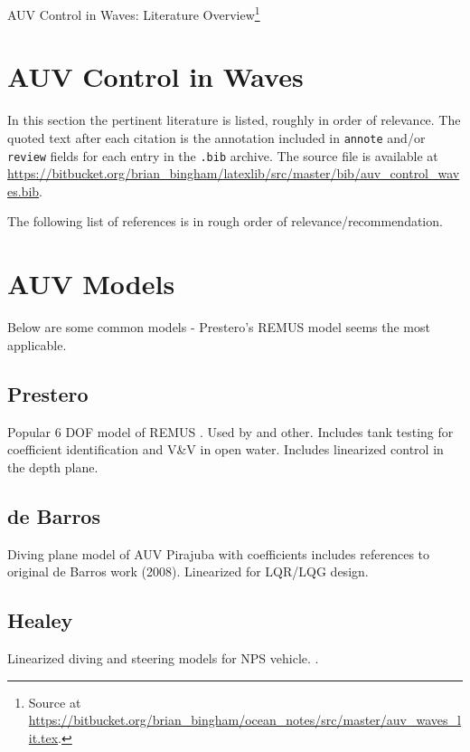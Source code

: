 \documentclass[11pt]{article}
\newcommand{\doctitle}{AUV Control in Waves: Literature Overview}
\begin{document}
\newpage
\setcounter{page}{1}
\begin{center}
{\huge \doctitle}\footnote{Source at \url{https://bitbucket.org/brian_bingham/ocean_notes/src/master/auv_waves_lit.tex}.}
\end{center}


\section{AUV Control in Waves}

\def  \Bibfname {auv_control_waves}

In this section the pertinent literature is listed, roughly in order of relevance.  The quoted text after each citation is the annotation included in \texttt{annote} and/or \texttt{review} fields for each entry in the \texttt{.bib} archive.  The source file is available at \url{https://bitbucket.org/brian_bingham/latexlib/src/master/bib/auv_control_waves.bib}.

The following list of references is in rough order of relevance/recommendation.



\bibliographyc{\Bibfname}


\section{AUV Models}

Below are some common models - Prestero's REMUS model seems the most applicable.

\subsection{Prestero}

Popular 6 DOF model of REMUS  . Used by  and other.  Includes tank testing for coefficient identification and V\&V in open water.  Includes linearized control in the depth plane.

\subsection{de Barros}

Diving plane model of AUV Pirajuba with coefficients  includes references to original de Barros work (2008).  Linearized for LQR/LQG design.

\subsection{Healey}

Linearized diving and steering models for NPS vehicle.
.


\newpage
\setcounter{page}{1}
\end{document}
